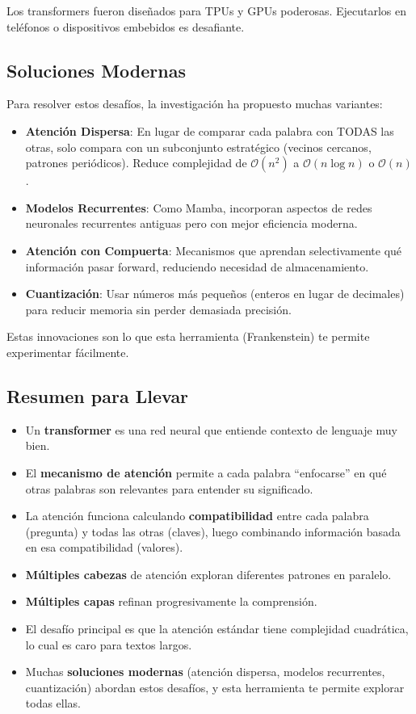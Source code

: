 \documentclass[11pt,a4paper]{article}
\begin{document}
Los transformers fueron diseñados para TPUs y GPUs poderosas. Ejecutarlos en teléfonos o dispositivos embebidos es desafiante.

\subsection{Soluciones Modernas}

Para resolver estos desafíos, la investigación ha propuesto muchas variantes:

\begin{itemize}[leftmargin=*]
    \item \textbf{Atención Dispersa}: En lugar de comparar cada palabra con TODAS las otras, solo compara con un subconjunto estratégico (vecinos cercanos, patrones periódicos). Reduce complejidad de $\mathcal{O}(n^2)$ a $\mathcal{O}(n \log n)$ o $\mathcal{O}(n)$.
    \item \textbf{Modelos Recurrentes}: Como Mamba, incorporan aspectos de redes neuronales recurrentes antiguas pero con mejor eficiencia moderna.
    \item \textbf{Atención con Compuerta}: Mecanismos que aprendan selectivamente qué información pasar forward, reduciendo necesidad de almacenamiento.
    \item \textbf{Cuantización}: Usar números más pequeños (enteros en lugar de decimales) para reducir memoria sin perder demasiada precisión.
\end{itemize}

Estas innovaciones son lo que esta herramienta (Frankenstein) te permite experimentar fácilmente.

\subsection{Resumen para Llevar}

\begin{itemize}[leftmargin=*]
    \item Un \textbf{transformer} es una red neural que entiende contexto de lenguaje muy bien.
    \item El \textbf{mecanismo de atención} permite a cada palabra ``enfocarse'' en qué otras palabras son relevantes para entender su significado.
    \item La atención funciona calculando \textbf{compatibilidad} entre cada palabra (pregunta) y todas las otras (claves), luego combinando información basada en esa compatibilidad (valores).
    \item \textbf{Múltiples cabezas} de atención exploran diferentes patrones en paralelo.
    \item \textbf{Múltiples capas} refinan progresivamente la comprensión.
    \item El desafío principal es que la atención estándar tiene complejidad cuadrática, lo cual es caro para textos largos.
    \item Muchas \textbf{soluciones modernas} (atención dispersa, modelos recurrentes, cuantización) abordan estos desafíos, y esta herramienta te permite explorar todas ellas.
\end{itemize}
\end{document}
